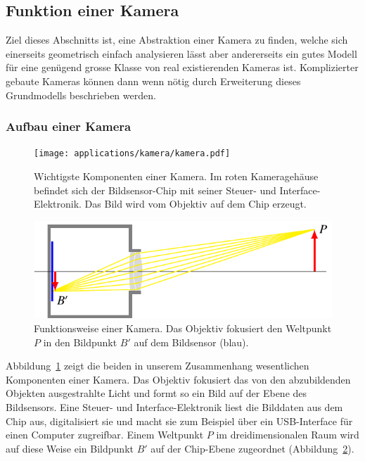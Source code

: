 %
%
%
\subsection{Funktion einer Kamera\label{subsection:kamerafunktion}}
Ziel dieses Abschnitts ist, eine Abstraktion einer Kamera zu finden,
welche sich einerseits geometrisch einfach analysieren lässt aber
andererseits ein gutes Modell für eine genügend grosse Klasse von
real existierenden Kameras ist.
Komplizierter gebaute Kameras können dann wenn nötig durch Erweiterung dieses
Grundmodells beschrieben werden.
\subsubsection{Aufbau einer Kamera}
\begin{figure}
\centering
\texttt{[image: applications/kamera/kamera.pdf]}
\caption{Wichtigste Komponenten einer Kamera. Im roten Kameragehäuse befindet
sich der Bildsensor-Chip mit seiner Steuer- und Interface-Elektronik.
Das Bild wird vom Objektiv auf dem Chip erzeugt.
\label{applications:kamera:kamera-bild}}
\end{figure}
\begin{figure}
\centering
\includegraphics{applications/kamera/kameraprinzip.pdf}
\caption{Funktionsweise einer Kamera. Das Objektiv fokusiert den
Weltpunkt $P$ in den Bildpunkt $B'$ auf dem Bildsensor ({\color{blue}blau}).
\label{applications:kamera:kameraprinzip}}
\end{figure}
Abbildung~\ref{applications:kamera:kamera-bild} zeigt die beiden in unserem
Zusammenhang wesentlichen Komponenten einer Kamera.
Das Objektiv fokusiert das von den abzubildenden Objekten ausgestrahlte
Licht und formt so ein Bild auf der Ebene des Bildsensors.
Eine Steuer- und Interface-Elektronik liest die Bilddaten aus dem Chip
aus, digitalisiert sie und macht sie zum Beispiel über ein USB-Interface
für einen Computer zugreifbar.
Einem Weltpunkt $P$ im dreidimensionalen Raum wird auf diese Weise ein
Bildpunkt $B'$ auf der Chip-Ebene zugeordnet
(Abbildung~\ref{applications:kamera:kameraprinzip}).

